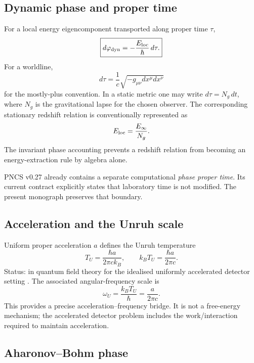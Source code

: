 \subsection{Dynamic phase and proper time}

For a local energy eigencomponent transported along proper time \(\tau\),
\begin{equation}
\boxed{d\varphi_{\rm dyn}=-\frac{E_{\rm loc}}{\hbar}\,d\tau.}
\label{eq:dynphase}
\end{equation}
For a worldline,
\begin{equation}
 d\tau=\frac1c\sqrt{-g_{\mu\nu}dx^\mu dx^\nu}
\end{equation}
for the mostly-plus convention. In a static metric one may write \(d\tau=N_g\,dt\), where \(N_g\) is the gravitational lapse for the chosen observer. The corresponding stationary redshift relation is conventionally represented as
\begin{equation}
 E_{\rm loc}=\frac{E_\infty}{N_g}.
\end{equation}
The invariant phase accounting prevents a redshift relation from becoming an energy-extraction rule by algebra alone.

PNCS v0.27 already contains a separate computational \emph{phase proper time}. Its current contract explicitly states that laboratory time is not modified. The present monograph preserves that boundary.

\subsection{Acceleration and the Unruh scale}

Uniform proper acceleration \(a\) defines the Unruh temperature
\begin{equation}
\boxed{T_U=\frac{\hbar a}{2\pi c k_B}},
\qquad
k_BT_U=\frac{\hbar a}{2\pi c}.
\end{equation}
Status:  in quantum field theory for the idealised uniformly accelerated detector setting \cite{Unruh1976}. The associated angular-frequency scale is
\begin{equation}
\omega_U=\frac{k_BT_U}{\hbar}=\frac{a}{2\pi c}.
\end{equation}
This provides a precise acceleration--frequency bridge. It is not a free-energy mechanism; the accelerated detector problem includes the work/interaction required to maintain acceleration.

\subsection{Aharonov--Bohm phase}

